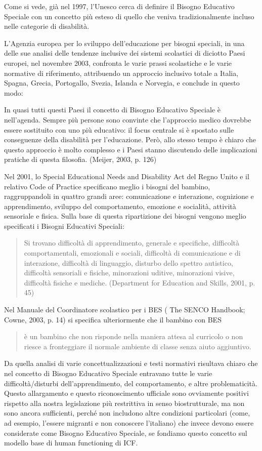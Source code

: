 Come si vede, già nel 1997, l'Unesco cerca di definire il Bisogno Educativo Speciale con un
concetto più esteso di quello che veniva tradizionalmente incluso nelle categorie di disabilità.

L'Agenzia europea per lo sviluppo dell'educazione per bisogni speciali, in una delle sue analisi
delle tendenze inclusive dei sistemi scolastici di diciotto Paesi europei, nel novembre 2003,
confronta le varie prassi scolastiche e le varie normative di riferimento, attribuendo un approccio
inclusivo totale a Italia, Spagna, Grecia, Portogallo, Svezia, Islanda e Norvegia, e conclude in questo
modo:

In quasi tutti questi Paesi il concetto di Bisogno Educativo Speciale è nell'agenda. Sempre più
persone sono convinte che l'approccio medico dovrebbe essere sostituito con uno più educativo: il
focus centrale si è spostato sulle conseguenze della disabilità per l'educazione. Però, allo stesso
tempo è chiaro che questo approccio è molto complesso e i Paesi stanno discutendo delle
implicazioni pratiche di questa filosofia. (Meijer, 2003, p. 126)


Nel 2001, lo Special Educational Needs and Disability Act del Regno Unito e il relativo Code of
Practice specificano meglio i bisogni del bambino, raggruppandoli in quattro grandi aree:
comunicazione e interazione, cognizione e apprendimento, sviluppo del comportamento,
emozione e socialità, attività sensoriale e fisica. Sulla base di questa ripartizione dei bisogni
vengono meglio specificati i Bisogni Educativi Speciali:
\begin{quote}
 \mancatesto Si trovano difficoltà di apprendimento, generale e specifiche, difficoltà comportamentali,
 emozionali e sociali, difficoltà di comunicazione e di interazione, difficoltà di linguaggio, disturbo
 dello spettro autistico, difficoltà sensoriali e fisiche, minorazioni uditive, minorazioni visive,
 difficoltà fisiche e mediche. (Department for Education and Skills, 2001, p. 45)
\end{quote}
Nel Manuale del Coordinatore scolastico per i BES ( The SENCO Handbook; Cowne, 2003, p.
14) si specifica ulteriormente che il bambino con BES
\begin{quote}
	\mancatesto è un bambino che non risponde nella maniera attesa al curricolo o non riesce a
	fronteggiare il normale ambiente di classe senza aiuto aggiuntivo.
\end{quote} 

Da quella analisi di varie concettualizzazioni e testi normativi risultava chiaro che nel concetto di
Bisogno Educativo Speciale entravano tutte le varie difficoltà/disturbi dell'apprendimento, del
comportamento, e altre problematicità. Questo allargamento e questo riconoscimento ufficiale
sono ovviamente positivi rispetto alla nostra legislazione più restrittiva in senso biostrutturale, ma
non sono ancora sufficienti, perché non includono altre condizioni particolari (come, ad esempio,
l'essere migranti e non conoscere l'italiano) che invece devono essere considerate come Bisogno
Educativo Speciale, se fondiamo questo concetto sul modello base di human functioning di ICF.

